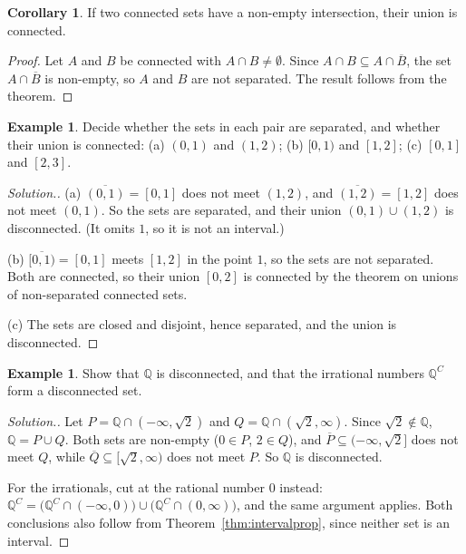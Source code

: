 \documentclass[11pt,a4paper]{article}
\numberwithin{equation}{section}
\theoremstyle{definition}
\newtheorem{exa}[thm]{Example}
\newtheorem{coro}[thm]{Corollary}
\newenvironment{solution}
  {\renewcommand{\qedsymbol}{}\begin{proof}[\textit{Solution}.]}
  {\end{proof}}
\begin{document}
\begin{coro}
If two connected sets have a non-empty intersection, their union is connected.
\end{coro}

\begin{proof}
Let $A$ and $B$ be connected with $A\cap B\neq\emptyset$. Since $A\cap B \subseteq A\cap \overline{B}$, the set $A\cap\overline{B}$ is non-empty, so $A$ and $B$ are not separated. The result follows from the theorem.
\end{proof}

\begin{exa}
Decide whether the sets in each pair are separated, and whether their union is connected: (a) $(0,1)$ and $(1,2)$; (b) $[0,1)$ and $[1,2]$; (c) $[0,1]$ and $[2,3]$.
\end{exa}

\begin{solution}
(a) $\overline{(0,1)} = [0,1]$ does not meet $(1,2)$, and $\overline{(1,2)} = [1,2]$ does not meet $(0,1)$. So the sets are separated, and their union $(0,1)\cup(1,2)$ is disconnected. (It omits $1$, so it is not an interval.)

(b) $\overline{[0,1)} = [0,1]$ meets $[1,2]$ in the point $1$, so the sets are not separated. Both are connected, so their union $[0,2]$ is connected by the theorem on unions of non-separated connected sets.

(c) The sets are closed and disjoint, hence separated, and the union is disconnected.
\end{solution}

\begin{exa}
Show that $\mathbb{Q}$ is disconnected, and that the irrational numbers $\mathbb{Q}^C$ form a disconnected set.
\end{exa}

\begin{solution}
Let $P = \mathbb{Q}\cap(-\infty,\sqrt{2})$ and $Q = \mathbb{Q}\cap(\sqrt{2},\infty)$. Since $\sqrt{2}\notin\mathbb{Q}$, $\mathbb{Q} = P\cup Q$. Both sets are non-empty ($0\in P$, $2\in Q$), and $\overline{P}\subseteq(-\infty,\sqrt{2}]$ does not meet $Q$, while $\overline{Q}\subseteq[\sqrt{2},\infty)$ does not meet $P$. So $\mathbb{Q}$ is disconnected.

For the irrationals, cut at the rational number $0$ instead: $\mathbb{Q}^C = \bigl(\mathbb{Q}^C\cap(-\infty,0)\bigr)\cup\bigl(\mathbb{Q}^C\cap(0,\infty)\bigr)$, and the same argument applies. Both conclusions also follow from Theorem~\ref{thm:intervalprop}, since neither set is an interval.
\end{solution}
\end{document}
